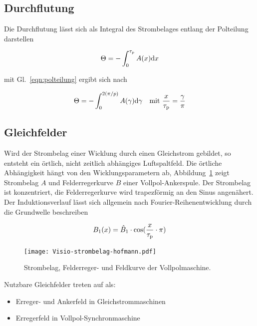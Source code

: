 \subsection{Durchflutung}\label{sec:durchflutung}

Die Durchflutung lässt sich als Integral des Strombelages entlang der Polteilung darstellen

\begin{align}
\Theta = -\int_0^{\tau_{\mathrm{p}}} A(x)\mathrm{d}x
\end{align}

mit Gl.~\ref{eqn:polteilung} ergibt sich nach \textcite[S.~200]{hofmann2013}

\begin{align}
\Theta = - \int_0^{2(\pi /p)} A(\gamma)\mathrm{d}\gamma \quad \text{mit}\,\, \frac{x}{\tau_{\mathrm{p}}}=\frac{\gamma}{\pi}
\end{align}

\subsection{Gleichfelder}\label{sec:gleichfelder}

Wird der Strombelag einer Wicklung durch einen Gleichstrom gebildet, so entsteht ein örtlich, nicht zeitlich abhängiges Luftspaltfeld.
Die örtliche Abhängigkeit hängt von den Wicklungsparametern ab, Abbildung~\ref{fig:Visio-strombelag-hofmann} zeigt Strombelag $A$ und Felderregerkurve $B$ einer Vollpol-Ankerspule.
Der Strombelag ist konzentriert, die Felderregerkurve wird trapezförmig an den Sinus angenähert.
Der Induktionsverlauf lässt sich allgemein nach Fourier-Reihenentwicklung durch die Grundwelle beschreiben

\begin{align}
B_{\mathrm{1}}(x) = \hat{B}_{\mathrm{1}}\cdot\cos(\frac{x}{\tau_{\mathrm{p}}}\cdot \pi)
\end{align}

\begin{figure}[h!]
\centering
\texttt{[image: Visio-strombelag-hofmann.pdf]}
\label{fig:Visio-strombelag-hofmann}
\caption{Strombelag, Felderreger- und Feldkurve der Vollpolmaschine.}
\end{figure}

Nutzbare Gleichfelder treten auf als:
\begin{itemize}
	\item Erreger- und Ankerfeld in Gleichstrommaschinen
	\item Erregerfeld in Vollpol-Synchronmaschine
\end{itemize}

